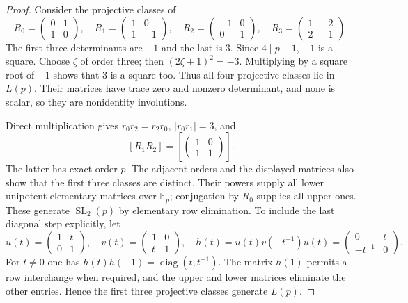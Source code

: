\documentclass[11pt]{article}
\begin{document}
\begin{proof}
Consider the projective classes of
\[
 R_0=\begin{pmatrix}0&1\\1&0\end{pmatrix},\quad
 R_1=\begin{pmatrix}1&0\\1&-1\end{pmatrix},\quad
 R_2=\begin{pmatrix}-1&0\\0&1\end{pmatrix},\quad
 R_3=\begin{pmatrix}1&-2\\2&-1\end{pmatrix}.
 \tag{1}\label{eq:matrices}
\]
The first three determinants are $-1$ and the last is $3$.
Since $4\mid p-1$, $-1$ is a square. Choose $\zeta$ of order three;
then $(2\zeta+1)^2=-3$. Multiplying by a square root of $-1$ shows that
$3$ is a square too. Thus all four projective classes lie in $L(p)$.
Their matrices have trace zero and nonzero determinant, and none is
scalar, so they are nonidentity involutions.

Direct multiplication gives $r_0r_2=r_2r_0$,
$|r_0r_1|=3$, and
\[
 [R_1R_2]=\left[\begin{pmatrix}1&0\\1&1\end{pmatrix}\right].
 \tag{2}\label{eq:unipotent}
\]
The latter has exact order $p$. The adjacent orders and the displayed
matrices also show that the first three classes are distinct. Their
powers supply all lower unipotent elementary matrices over $\mathbb F_p$;
conjugation by $R_0$ supplies all upper ones. These generate
$\operatorname{SL}_2(p)$ by elementary row elimination. To include the
last diagonal step explicitly, let
\[
 u(t)=\begin{pmatrix}1&t\\0&1\end{pmatrix},\quad
 v(t)=\begin{pmatrix}1&0\\t&1\end{pmatrix},\quad
 h(t)=u(t)v(-t^{-1})u(t)=\begin{pmatrix}0&t\\-t^{-1}&0\end{pmatrix}.
\]
For $t\ne0$ one has $h(t)h(-1)=\operatorname{diag}(t,t^{-1})$.
The matrix $h(1)$ permits a row interchange when required, and the upper
and lower matrices eliminate the other entries. Hence the first three
projective classes generate $L(p)$.


\end{proof}
\end{document}
